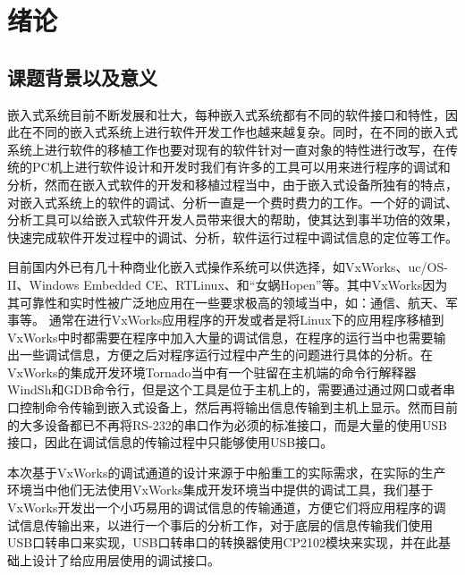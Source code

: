 \chapter{绪论}
\section{课题背景以及意义}
	嵌入式系统目前不断发展和壮大，每种嵌入式系统都有不同的软件接口和特性，因此在不同的嵌入式系统上进行软件开发工作也越来越复杂。同时，在不同的嵌入式系统上进行软件的移植工作也要对现有的软件针对一直对象的特性进行改写，在传统的PC机上进行软件设计和开发时我们有许多的工具可以用来进行程序的调试和分析，然而在嵌入式软件的开发和移植过程当中，由于嵌入式设备所独有的特点，对嵌入式系统上的软件的调试、分析一直是一个费时费力的工作。一个好的调试、分析工具可以给嵌入式软件开发人员带来很大的帮助，使其达到事半功倍的效果，快速完成软件开发过程中的调试、分析，软件运行过程中调试信息的定位等工作。
		
	目前国内外已有几十种商业化嵌入式操作系统可以供选择，如VxWorks、uc/OS-II、Windows Embedded CE、RTLinux、和“女蜗Hopen”等。其中VxWorks因为其可靠性和实时性被广泛地应用在一些要求极高的领域当中，如：通信、航天、军事等\cite{刘小军2008基于}。
	通常在进行VxWorks应用程序的开发或者是将Linux下的应用程序移植到VxWorks中时都需要在程序中加入大量的调试信息，在程序的运行当中也需要输出一些调试信息，方便之后对程序运行过程中产生的问题进行具体的分析。在VxWorks的集成开发环境Tornado当中有一个驻留在主机端的命令行解释器WindSh和GDB命令行，但是这个工具是位于主机上的，需要通过通过网口或者串口控制命令传输到嵌入式设备上，然后再将输出信息传输到主机上显示。然而目前的大多设备都已不再将RS-232的串口作为必须的标准接口，而是大量的使用USB接口，因此在调试信息的传输过程中只能够使用USB接口。
	
	
	本次基于VxWorks的调试通道的设计来源于中船重工的实际需求，在实际的生产环境当中他们无法使用VxWorks集成开发环境当中提供的调试工具，我们基于VxWorks开发出一个小巧易用的调试信息的传输通道，方便它们将应用程序的调试信息传输出来，以进行一个事后的分析工作，对于底层的信息传输我们使用USB口转串口来实现，USB口转串口的转换器使用CP2102模块来实现，并在此基础上设计了给应用层使用的调试接口。
	
		
			
